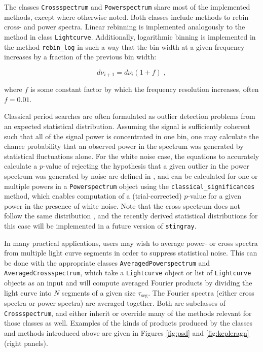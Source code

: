 \documentclass[twocolumn]{aastex62}
\newcommand{\stingray}{\texttt{stingray}\xspace}
\newcommand{\lightcurve}{\texttt{Lightcurve}\xspace}
\newcommand{\crossspectrum}{\texttt{Crossspectrum}\xspace}
\newcommand{\powerspectrum}{\texttt{Powerspectrum}\xspace}
\begin{document}
The classes \crossspectrum and \powerspectrum share most of the implemented methods, except where otherwise noted. 
Both classes include methods to rebin cross- and power spectra. Linear rebinning is implemented analogously to the method in class \lightcurve. 
Additionally, logarithmic binning is implemented in the method \texttt{rebin\_log} in such a way that the bin width at a given frequency increases by a fraction of the previous bin width:

\[
d\nu_{i+1} = d\nu_{i} (1 + f) \; ,
\]

\noindent where $f$ is some constant factor by which the frequency resolution increases, often $f = 0.01$. 

Classical period searches are often formulated as outlier detection problems from an expected statistical distribution. 
Assuming the signal is sufficiently coherent such that all of the signal power is concentrated in one bin, one may calculate the chance probability that an observed power in the spectrum was generated by statistical fluctuations alone. 
For the white noise case, the equations to accurately calculate a $p$-value of rejecting the hypothesis that a given outlier in the power spectrum was generated by noise are defined in \citet{Groth1975}, and can be calculated for one or multiple powers in a \powerspectrum object using the \verb|classical_significances| method, which enables computation of a (trial-corrected) $p$-value for a given power in the presence of white noise.
Note that the cross spectrum does not follow the same distribution \citep{huppenkothen2017}, and the recently derived statistical distributions for this case will be implemented in a future version of \stingray. 

In many practical applications, users may wish to average power- or cross spectra from multiple light curve segments in order to suppress statistical noise. 
This can be done with the appropriate classes \texttt{AveragedPowerspectrum} and \texttt{AveragedCrossspectrum}, which take a \lightcurve object or list of \lightcurve objects as an input and will compute averaged Fourier products by dividing the light curve into $N$ segments of a given size $\tau_\mathrm{seg}$. 
The Fourier spectra (either cross spectra or power spectra) are averaged together. 
Both are subclasses of \crossspectrum, and either inherit or override many of the methods relevant for those classes as well. 
Examples of the kinds of products produced by the classes and methods introduced above are given in Figures \ref{fig:psd} and \ref{fig:kepleragn} (right panels).
\end{document}
